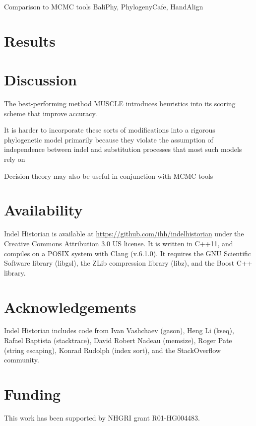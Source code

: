 \documentclass{bioinfo}
\begin{document}
Comparison to MCMC tools
BaliPhy, PhylogenyCafe, HandAlign


\section{Results}



\section{Discussion}



The best-performing method MUSCLE introduces heuristics into its scoring scheme
that improve accuracy.

It is harder to incorporate these sorts of modifications into a rigorous phylogenetic model
primarily because they violate the assumption of independence
between indel and substitution processes
that most such models rely on

Decision theory may also be useful in conjunction with MCMC tools \cite{HermanHeinEtc}



\section{Availability}

Indel Historian is available at \url{https://github.com/ihh/indelhistorian} under the Creative Commons Attribution 3.0 US license. It is written in C++11, and compiles on a POSIX system with Clang (v.6.1.0). It requires the GNU Scientific Software library (libgsl), the ZLib compression library (libz), and the Boost C++ library.

\section*{Acknowledgements}

Indel Historian includes code from Ivan Vashchaev (gason), Heng Li (kseq), Rafael Baptista (stacktrace), David Robert Nadeau (memsize), Roger Pate (string escaping), Konrad Rudolph (index sort), and the StackOverflow community.

\section*{Funding}

This work has been supported by NHGRI grant R01-HG004483.


%
%
%
%
%
%
%
%



\end{document}
